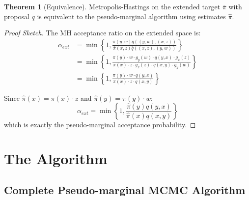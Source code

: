 \documentclass[11pt]{article}
\theoremstyle{definition}
\newtheorem{theorem}{Theorem}
\begin{document}
\begin{theorem}[Equivalence]
Metropolis-Hastings on the extended target $\bar{\pi}$ with proposal $\bar{q}$ is equivalent to the pseudo-marginal algorithm using estimates $\hat{\pi}$.
\end{theorem}

\begin{proof}[Proof Sketch]
The MH acceptance ratio on the extended space is:
\begin{align}
\alpha_{ext} &= \min\left\{1, \frac{\bar{\pi}(y,w)\bar{q}((y,w),(x,z))}{\bar{\pi}(x,z)\bar{q}((x,z),(y,w))}\right\}\\
&= \min\left\{1, \frac{\pi(y) \cdot w \cdot g_y(w) \cdot q(y,x) \cdot g_x(z)}{\pi(x) \cdot z \cdot g_x(z) \cdot q(x,y) \cdot g_y(w)}\right\}\\
&= \min\left\{1, \frac{\pi(y) \cdot w \cdot q(y,x)}{\pi(x) \cdot z \cdot q(x,y)}\right\}
\end{align}

Since $\hat{\pi}(x) = \pi(x) \cdot z$ and $\hat{\pi}(y) = \pi(y) \cdot w$:
\begin{equation}
\alpha_{ext} = \min\left\{1, \frac{\hat{\pi}(y)q(y,x)}{\hat{\pi}(x)q(x,y)}\right\}
\end{equation}
which is exactly the pseudo-marginal acceptance probability.
\end{proof}

\section{The Algorithm}

\subsection{Complete Pseudo-marginal MCMC Algorithm}
\end{document}
